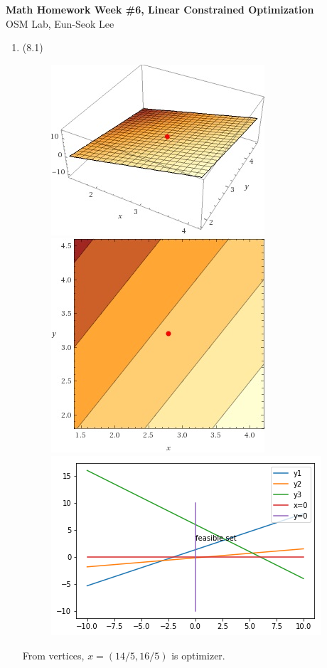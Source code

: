 \documentclass[letterpaper,12pt]{article}
\theoremstyle{definition}
\begin{document}
\begin{flushleft}
   \textbf{\large{Math Homework Week \#6, Linear Constrained Optimization}} \\[5pt]
   OSM Lab, Eun-Seok Lee \\[5pt]

\end{flushleft}

\vspace{5mm}

\begin{enumerate}



	\item (8.1) \\
\begin{figure}[htbp]
\begin{center}
    \includegraphics[scale=0.9]{8p1a}
    \includegraphics[scale=0.5]{8p1b}
    \includegraphics[scale=0.5]{8p1c}
    \caption{} \label{fig:label}
\end{center}
\end{figure}
	From vertices, $x = (14/5, 16/5)$ is optimizer.



\end{enumerate}
\end{document}
